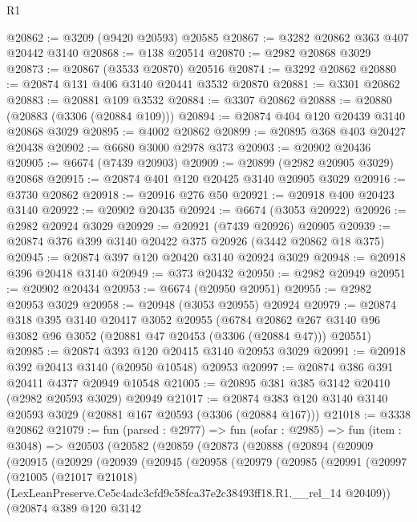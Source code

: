 \begin{lexlean}{R1}
\begin{coremodule}
@20862 := @3209 (@9420 @20593) @20585
@20867 := @3282 @20862 @363 @407 @20442 @3140
@20868 := @138 @20514
@20870 := @2982 @20868 @3029
@20873 := @20867 (@3533 @20870) @20516
@20874 := @3292 @20862
@20880 := @20874 @131 @406 @3140 @20441 @3532 @20870
@20881 := @3301 @20862
@20883 := @20881 @109 @3532
@20884 := @3307 @20862
@20888 := @20880 (@20883 (@3306 (@20884 @109)))
@20894 := @20874 @404 @120 @20439 @3140 @20868 @3029
@20895 := @4002 @20862
@20899 := @20895 @368 @403 @20427 @20438
@20902 := @6680 @3000 @2978 @373
@20903 := @20902 @20436
@20905 := @6674 (@7439 @20903)
@20909 := @20899 (@2982 @20905 @3029) @20868
@20915 := @20874 @401 @120 @20425 @3140 @20905 @3029
@20916 := @3730 @20862
@20918 := @20916 @276 @50
@20921 := @20918 @400 @20423 @3140
@20922 := @20902 @20435
@20924 := @6674 (@3053 @20922)
@20926 := @2982 @20924 @3029
@20929 := @20921 (@7439 @20926) @20905
@20939 := @20874 @376 @399 @3140 @20422 @375 @20926 (@3442 @20862 @18 @375)
@20945 := @20874 @397 @120 @20420 @3140 @20924 @3029
@20948 := @20918 @396 @20418 @3140
@20949 := @373 @20432
@20950 := @2982 @20949
@20951 := @20902 @20434
@20953 := @6674 (@20950 @20951)
@20955 := @2982 @20953 @3029
@20958 := @20948 (@3053 @20955) @20924
@20979 := @20874
    @318
    @395
    @3140
    @20417
    @3052
    @20955
    (@6784 @20862 @267 @3140 @96 @3082 @96 @3052 (@20881 @47 @20453 (@3306 (@20884 @47))) @20551)
@20985 := @20874 @393 @120 @20415 @3140 @20953 @3029
@20991 := @20918 @392 @20413 @3140 (@20950 @10548) @20953
@20997 := @20874 @386 @391 @20411 @4377 @20949 @10548
@21005 := @20895 @381 @385 @3142 @20410 (@2982 @20593 @3029) @20949
@21017 := @20874 @383 @120 @3140 @3140 @20593 @3029 (@20881 @167 @20593 (@3306 (@20884 @167)))
@21018 := @3338 @20862
@21079 := fun (parsed : @2977) =>
  fun (sofar : @2985) =>
  fun (item : @3048) =>
  @20503
    (@20582
      (@20859
        (@20873
          (@20888
            (@20894
              (@20909
                (@20915
                  (@20929
                    (@20939
                      (@20945
                        (@20958
                          (@20979
                            (@20985
                              (@20991
                                (@20997
                                  (@21005
                                    (@21017 @21018)
                                    (LexLeanPreserve.Ce5c4adc3cfd9c58fca37e2c38493ff18.R1.__rel_14
                                      @20409))
                                  (@20874
                                    @389
                                    @120
                                    @3142

\end{coremodule}
\end{lexlean}
